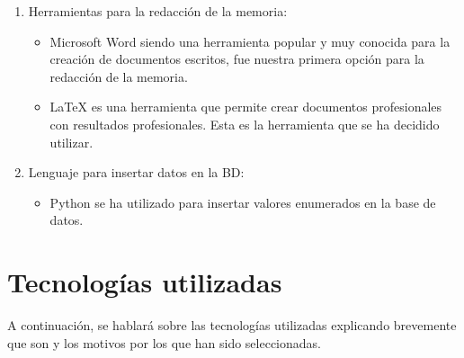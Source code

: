\documentclass[11pt]{book}
\begin{document}
\begin{enumerate}
\begin{itemize}
		\end{itemize}
		\item Herramientas para la redacción de la memoria:
		\begin{itemize} 
			\item Microsoft Word siendo una herramienta popular y muy conocida para la creación de documentos escritos, fue nuestra primera opción para la redacción de la memoria.
			\item LaTeX es una herramienta que permite crear documentos profesionales con resultados profesionales. Esta es la herramienta que se ha decidido utilizar.
		\end{itemize}
		\item Lenguaje para insertar datos en la BD:
		\begin{itemize} 
			\item Python se ha utilizado para insertar valores enumerados en la base de datos.
		\end{itemize}
	\end{enumerate}
	
	\chapter{Tecnologías utilizadas}
	A continuación, se hablará sobre las tecnologías utilizadas explicando brevemente que son y los motivos por los que han sido seleccionadas.
	
\end{document}
